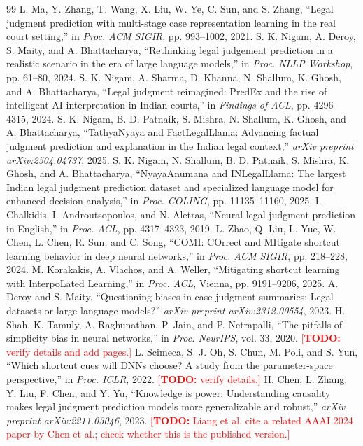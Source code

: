 \documentclass[conference]{IEEEtran}
\newcommand{\TODO}[1]{\textcolor{red}{[\textbf{TODO:} #1]}}
\begin{document}
\begin{thebibliography}{99}
 L. Ma, Y. Zhang, T. Wang, X. Liu, W. Ye, C. Sun, and S. Zhang, ``Legal judgment prediction with multi-stage case representation learning in the real court setting,'' in \textit{Proc. ACM SIGIR}, pp. 993--1002, 2021.
 S. K. Nigam, A. Deroy, S. Maity, and A. Bhattacharya, ``Rethinking legal judgement prediction in a realistic scenario in the era of large language models,'' in \textit{Proc. NLLP Workshop}, pp. 61--80, 2024.
 S. K. Nigam, A. Sharma, D. Khanna, N. Shallum, K. Ghosh, and A. Bhattacharya, ``Legal judgment reimagined: PredEx and the rise of intelligent AI interpretation in Indian courts,'' in \textit{Findings of ACL}, pp. 4296--4315, 2024.
 S. K. Nigam, B. D. Patnaik, S. Mishra, N. Shallum, K. Ghosh, and A. Bhattacharya, ``TathyaNyaya and FactLegalLlama: Advancing factual judgment prediction and explanation in the Indian legal context,'' \textit{arXiv preprint arXiv:2504.04737}, 2025.
 S. K. Nigam, N. Shallum, B. D. Patnaik, S. Mishra, K. Ghosh, and A. Bhattacharya, ``NyayaAnumana and INLegalLlama: The largest Indian legal judgment prediction dataset and specialized language model for enhanced decision analysis,'' in \textit{Proc. COLING}, pp. 11135--11160, 2025.
 I. Chalkidis, I. Androutsopoulos, and N. Aletras, ``Neural legal judgment prediction in English,'' in \textit{Proc. ACL}, pp. 4317--4323, 2019.
 L. Zhao, Q. Liu, L. Yue, W. Chen, L. Chen, R. Sun, and C. Song, ``COMI: COrrect and MItigate shortcut learning behavior in deep neural networks,'' in \textit{Proc. ACM SIGIR}, pp. 218--228, 2024.
 M. Korakakis, A. Vlachos, and A. Weller, ``Mitigating shortcut learning with InterpoLated Learning,'' in \textit{Proc. ACL}, Vienna, pp. 9191--9206, 2025.
 A. Deroy and S. Maity, ``Questioning biases in case judgment summaries: Legal datasets or large language models?'' \textit{arXiv preprint arXiv:2312.00554}, 2023.
 H. Shah, K. Tamuly, A. Raghunathan, P. Jain, and P. Netrapalli, ``The pitfalls of simplicity bias in neural networks,'' in \textit{Proc. NeurIPS}, vol. 33, 2020. \TODO{verify details and add pages.}
 L. Scimeca, S. J. Oh, S. Chun, M. Poli, and S. Yun, ``Which shortcut cues will DNNs choose? A study from the parameter-space perspective,'' in \textit{Proc. ICLR}, 2022. \TODO{verify details.}
 H. Chen, L. Zhang, Y. Liu, F. Chen, and Y. Yu, ``Knowledge is power: Understanding causality makes legal judgment prediction models more generalizable and robust,'' \textit{arXiv preprint arXiv:2211.03046}, 2023. \TODO{Liang et al. cite a related AAAI 2024 paper by Chen et al.; check whether this is the published version.}

\end{thebibliography}
\end{document}
